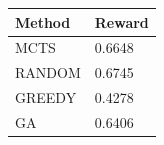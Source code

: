 \begin{tabular}{ll}
\hline
Method & Reward \\
\hline
  MCTS & 0.6648 \\
  RANDOM & 0.6745 \\
  GREEDY & 0.4278 \\
  GA & 0.6406 \\
\hline
\end{tabular}
